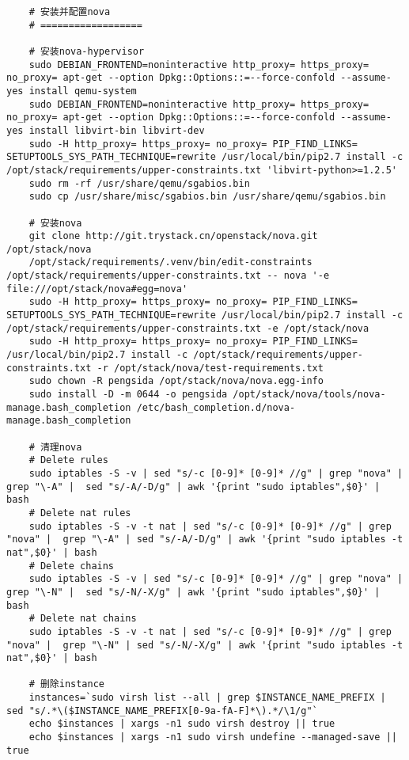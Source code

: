 \documentclass[a4paper,left=1.5cm,right=1.5cm,11pt]{article}
\begin{document}
\begin{lstlisting}
	# 安装并配置nova
	# ==================

	# 安装nova-hypervisor
	sudo DEBIAN_FRONTEND=noninteractive http_proxy= https_proxy= no_proxy= apt-get --option Dpkg::Options::=--force-confold --assume-yes install qemu-system
	sudo DEBIAN_FRONTEND=noninteractive http_proxy= https_proxy= no_proxy= apt-get --option Dpkg::Options::=--force-confold --assume-yes install libvirt-bin libvirt-dev
	sudo -H http_proxy= https_proxy= no_proxy= PIP_FIND_LINKS= SETUPTOOLS_SYS_PATH_TECHNIQUE=rewrite /usr/local/bin/pip2.7 install -c /opt/stack/requirements/upper-constraints.txt 'libvirt-python>=1.2.5'
	sudo rm -rf /usr/share/qemu/sgabios.bin
	sudo cp /usr/share/misc/sgabios.bin /usr/share/qemu/sgabios.bin

	# 安装nova
	git clone http://git.trystack.cn/openstack/nova.git /opt/stack/nova
	/opt/stack/requirements/.venv/bin/edit-constraints /opt/stack/requirements/upper-constraints.txt -- nova '-e file:///opt/stack/nova#egg=nova'
	sudo -H http_proxy= https_proxy= no_proxy= PIP_FIND_LINKS= SETUPTOOLS_SYS_PATH_TECHNIQUE=rewrite /usr/local/bin/pip2.7 install -c /opt/stack/requirements/upper-constraints.txt -e /opt/stack/nova
	sudo -H http_proxy= https_proxy= no_proxy= PIP_FIND_LINKS= /usr/local/bin/pip2.7 install -c /opt/stack/requirements/upper-constraints.txt -r /opt/stack/nova/test-requirements.txt
	sudo chown -R pengsida /opt/stack/nova/nova.egg-info
	sudo install -D -m 0644 -o pengsida /opt/stack/nova/tools/nova-manage.bash_completion /etc/bash_completion.d/nova-manage.bash_completion
	
	# 清理nova
	# Delete rules
    sudo iptables -S -v | sed "s/-c [0-9]* [0-9]* //g" | grep "nova" | grep "\-A" |  sed "s/-A/-D/g" | awk '{print "sudo iptables",$0}' | bash
    # Delete nat rules
    sudo iptables -S -v -t nat | sed "s/-c [0-9]* [0-9]* //g" | grep "nova" |  grep "\-A" | sed "s/-A/-D/g" | awk '{print "sudo iptables -t nat",$0}' | bash
    # Delete chains
    sudo iptables -S -v | sed "s/-c [0-9]* [0-9]* //g" | grep "nova" | grep "\-N" |  sed "s/-N/-X/g" | awk '{print "sudo iptables",$0}' | bash
    # Delete nat chains
    sudo iptables -S -v -t nat | sed "s/-c [0-9]* [0-9]* //g" | grep "nova" |  grep "\-N" | sed "s/-N/-X/g" | awk '{print "sudo iptables -t nat",$0}' | bash
	
	# 删除instance
	instances=`sudo virsh list --all | grep $INSTANCE_NAME_PREFIX | sed "s/.*\($INSTANCE_NAME_PREFIX[0-9a-fA-F]*\).*/\1/g"`
	echo $instances | xargs -n1 sudo virsh destroy || true
	echo $instances | xargs -n1 sudo virsh undefine --managed-save || true


\end{lstlisting}
\end{document}

